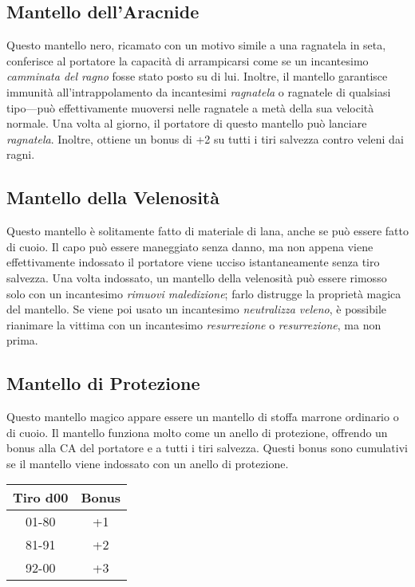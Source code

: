\documentclass{article}
\begin{document}
\begin{multicols}{2}
\subsection{Mantello dell'Aracnide}
Questo mantello nero, ricamato con un motivo simile a una ragnatela in seta, conferisce al portatore la capacità di arrampicarsi come se un incantesimo \textit{camminata del ragno} fosse stato posto su di lui. Inoltre, il mantello garantisce immunità all'intrappolamento da incantesimi \textit{ragnatela} o ragnatele di qualsiasi tipo—può effettivamente muoversi nelle ragnatele a metà della sua velocità normale. Una volta al giorno, il portatore di questo mantello può lanciare \textit{ragnatela}. Inoltre, ottiene un bonus di +2 su tutti i tiri salvezza contro veleni dai ragni.

\subsection{Mantello della Velenosità}
Questo mantello è solitamente fatto di materiale di lana, anche se può essere fatto di cuoio. Il capo può essere maneggiato senza danno, ma non appena viene effettivamente indossato il portatore viene ucciso istantaneamente senza tiro salvezza. Una volta indossato, un mantello della velenosità può essere rimosso solo con un incantesimo \textit{rimuovi maledizione}; farlo distrugge la proprietà magica del mantello. Se viene poi usato un incantesimo \textit{neutralizza veleno}, è possibile rianimare la vittima con un incantesimo \textit{resurrezione} o \textit{resurrezione}, ma non prima.

\subsection{Mantello di Protezione}
Questo mantello magico appare essere un mantello di stoffa marrone ordinario o di cuoio. Il mantello funziona molto come un anello di protezione, offrendo un bonus alla CA del portatore e a tutti i tiri salvezza. Questi bonus sono cumulativi se il mantello viene indossato con un anello di protezione.

\begin{table}[h]
\centering
\begin{tabular}{|c|c|}
\hline
\textbf{Tiro d00} & \textbf{Bonus} \\
\hline
01-80 & +1 \\
81-91 & +2 \\
92-00 & +3 \\
\hline
\end{tabular}


\end{table}
\end{multicols}
\end{document}

